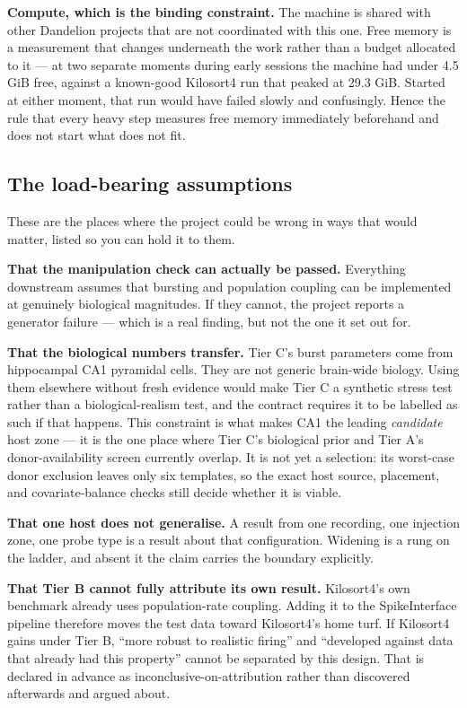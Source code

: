 \documentclass[12pt]{article}
\begin{document}
\textbf{Compute, which is the binding constraint.} The machine is shared with other Dandelion
projects that are not coordinated with this one. Free memory is a measurement that changes
underneath the work rather than a budget allocated to it --- at two separate moments during
early sessions the machine had under 4.5 GiB free, against a known-good Kilosort4 run that
peaked at 29.3 GiB. Started at either moment, that run would have failed slowly and
confusingly. Hence the rule that every heavy step measures free memory immediately beforehand
and does not start what does not fit.

\subsection{The load-bearing assumptions}

These are the places where the project could be wrong in ways that would matter, listed so
you can hold it to them.

\textbf{That the manipulation check can actually be passed.} Everything downstream assumes
that bursting and population coupling can be implemented at genuinely biological magnitudes.
If they cannot, the project reports a generator failure --- which is a real finding, but not
the one it set out for.

\textbf{That the biological numbers transfer.} Tier C's burst parameters come from
hippocampal CA1 pyramidal cells. They are not generic brain-wide biology. Using them elsewhere
without fresh evidence would make Tier C a synthetic stress test rather than a
biological-realism test, and the contract requires it to be labelled as such if that happens.
This constraint is what makes CA1 the leading \emph{candidate} host zone --- it is the one
place where Tier C's biological prior and Tier A's donor-availability screen currently
overlap. It is not yet a selection: its worst-case donor exclusion leaves only six templates,
so the exact host source, placement, and covariate-balance checks still decide whether it is
viable.

\textbf{That one host does not generalise.} A result from one recording, one injection zone,
one probe type is a result about that configuration. Widening is a rung on the ladder, and
absent it the claim carries the boundary explicitly.

\textbf{That Tier B cannot fully attribute its own result.} Kilosort4's own benchmark already
uses population-rate coupling. Adding it to the SpikeInterface pipeline therefore moves the
test data toward Kilosort4's home turf. If Kilosort4 gains under Tier B, ``more robust to
realistic firing'' and ``developed against data that already had this property'' cannot be
separated by this design. That is declared in advance as inconclusive-on-attribution rather
than discovered afterwards and argued about.
\end{document}
